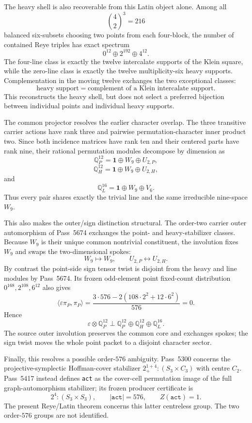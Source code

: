 The heavy shell is also recoverable from this Latin object alone.  Among all
\[
 \binom42^3=216
\]
balanced six-subsets choosing two points from each four-block, the number of
contained Reye triples has exact spectrum
\[
 \boxed{0^{12}\oplus2^{192}\oplus4^{12}}.
\]
The four-line class is exactly the twelve intercalate supports of the Klein
square, while the zero-line class is exactly the twelve multiplicity-six heavy
supports.  Complementation in the moving twelve exchanges the two exceptional
classes:
\[
 \boxed{
 \text{heavy support}
 =\text{complement of a Klein intercalate support}.
 }
\]
This reconstructs the heavy shell, but does not select a preferred bijection
between individual points and individual heavy supports.

The common projector resolves the earlier character overlap.  The three
transitive carrier actions have rank three and pairwise permutation-character
inner product two.  Since both incidence matrices have rank ten and their
centered parts have rank nine, their rational permutation modules decompose by
dimension as
\[
 \boxed{
 \mathbb Q^{12}_{P}=\mathbf1\oplus W_9\oplus U_{2,P},
 }
\]
\[
 \boxed{
 \mathbb Q^{12}_{H}=\mathbf1\oplus W_9\oplus U_{2,H},
 }
\]
and
\[
 \boxed{
 \mathbb Q^{16}_{L}=\mathbf1\oplus W_9\oplus V_6.
 }
\]
Thus every pair shares exactly the trivial line and the same irreducible
nine-space $W_9$.

This also makes the outer/sign distinction structural.  The order-two carrier
outer automorphism of Pass~5674 exchanges the point- and heavy-stabilizer
classes.  Because $W_9$ is their unique common nontrivial constituent, the
involution fixes $W_9$ and swaps the two-dimensional spokes:
\[
 \boxed{W_9\mapsto W_9,
 \qquad U_{2,P}\leftrightarrow U_{2,H}.}
\]
By contrast the point-side sign tensor twist is disjoint from the heavy and line
modules by Pass~5674.  Its frozen odd-element point fixed-count distribution
$0^{168},2^{108},6^{12}$ also gives
\[
 \langle\varepsilon\pi_P,\pi_P\rangle
 =\frac{3\cdot576-2(108\cdot2^2+12\cdot6^2)}{576}=0.
\]
Hence
\[
 \boxed{
 \varepsilon\otimes\mathbb Q^{12}_P
 \perp
 \mathbb Q^{12}_P\oplus\mathbb Q^{12}_H\oplus\mathbb Q^{16}_L.
 }
\]
The source outer involution preserves the common core and exchanges spokes;
the sign twist moves the whole point packet to a disjoint character sector.

Finally, this resolves a possible order-$576$ ambiguity.  Pass~5300 concerns
the projective-symplectic Hoffman-cover stabilizer
$2_+^{1+4}:(S_3\times C_3)$ with centre $C_2$.  Pass~5417 instead defines
\texttt{act} as the cover-cell permutation image of the full graph-automorphism
stabilizer; its frozen producer certificate is
\[
 \boxed{2^4:(S_3\times S_3),\qquad |\texttt{act}|=576,
 \qquad Z(\texttt{act})=1.}
\]
The present Reye/Latin theorem concerns this latter centreless group.  The two
order-$576$ groups are not identified.

